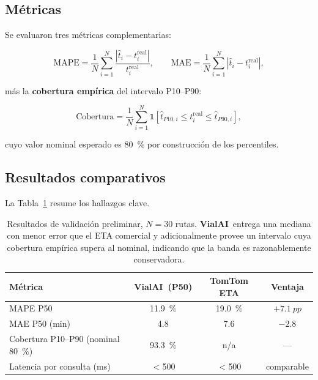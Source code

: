 \documentclass[11pt,a4paper]{article}
\newcommand{\VialAI}{\textbf{\textcolor{vialTeal}{Vial}\textcolor{vialAmber}{AI}}}
\newcommand{\MAPE}{\text{MAPE}}
\begin{document}
\subsection{Métricas}

Se evaluaron tres métricas complementarias:

\begin{equation}
\MAPE = \frac{1}{N}\sum_{i=1}^{N}
\frac{|\hat{t}_i - t_i^{\text{real}}|}{t_i^{\text{real}}},
\qquad
\text{MAE} = \frac{1}{N}\sum_{i=1}^{N} |\hat{t}_i - t_i^{\text{real}}|,
\end{equation}

más la \textbf{cobertura empírica} del intervalo P10--P90:

\begin{equation}
\text{Cobertura} = \frac{1}{N}\sum_{i=1}^{N}
\mathbf{1}[\hat{t}_{P10,i} \leq t_i^{\text{real}} \leq
\hat{t}_{P90,i}],
\end{equation}

cuyo valor nominal esperado es \SI{80}{\percent} por
construcción de los percentiles.

\subsection{Resultados comparativos}

La Tabla~\ref{tab:resultados} resume los hallazgos clave.

\begin{table}[H]
\centering
\small
\renewcommand{\arraystretch}{1.3}
\begin{tabularx}{\linewidth}{@{}X c c c@{}}
\toprule
\rowcolor{vialNavy!10}
\textbf{Métrica} & \textbf{\VialAI\ (P50)} & \textbf{TomTom ETA}
& \textbf{Ventaja} \\
\midrule
MAPE P50 & \SI{11.9}{\percent} & \SI{19.0}{\percent} &
$+\SI{7.1}{pp}$\\
MAE P50 (min) & \num{4.8} & \num{7.6} & $-\num{2.8}$\\
Cobertura P10--P90 (nominal \SI{80}{\percent}) &
\SI{93.3}{\percent} & n/a & ---\\
Latencia por consulta (ms) & $<$\num{500} & $<$\num{500} &
comparable\\
\bottomrule
\end{tabularx}
\caption{Resultados de validación preliminar, $N=\num{30}$
rutas. \VialAI\ entrega una mediana con menor error que el ETA
comercial y adicionalmente provee un intervalo cuya cobertura
empírica supera al nominal, indicando que la banda es
razonablemente conservadora.}
\label{tab:resultados}
\end{table}
\end{document}
